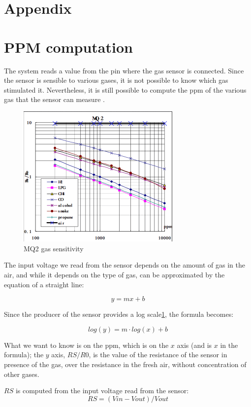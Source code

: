 \documentclass[]{article}
\begin{document}
\newpage 

\section*{Appendix}
\appendix
\section{PPM computation}\label{appendix}

The system reads a value from the pin where the gas sensor is connected. Since the sensor is sensible to various gases, it is not possible to know which gas stimulated it. Nevertheless, it is still possible to compute the ppm of the various gas that the sensor can measure \cite{tut:ppm}. 

\begin{figure}[!h]
	\centering
	\includegraphics[width=8cm]{img/Gas-Sensor-MQ2.png}
	\caption{\label{mq2table}MQ2 gas sensitivity}
\end{figure}

The input voltage we read from the sensor depends on the amount of gas in the air, and while it depends on the type of gas, can be approximated by the equation of a straight line:

$$ y = mx + b $$

Since the producer of the sensor provides a log scale\ref{mq2table}, the formula becomes:

$$   log(y) = m\cdot log(x) + b   $$

What we want to know is on the ppm, which is on the $ x $ axis (and is $ x $ in the formula); the $ y $ axis, $ RS/R0 $, is the value of the resistance of the sensor in presence of the gas, over the resistance in the fresh air, without concentration of other gases. 

$ RS $ is computed from the input voltage read from the sensor:
$$ RS = (Vin - Vout)/Vout $$
\end{document}
